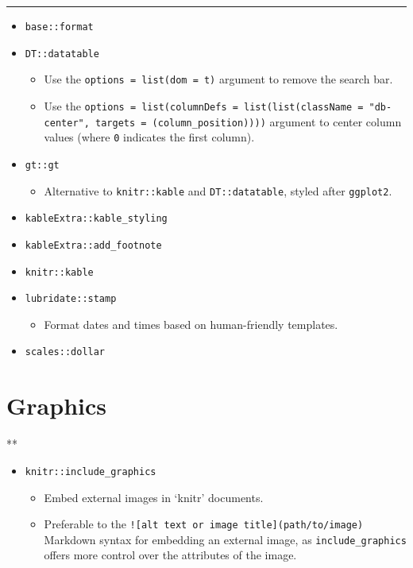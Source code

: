 \documentclass[
]{book}
\providecommand{\tightlist}{%
  \setlength{\itemsep}{0pt}\setlength{\parskip}{0pt}}
\begin{document}
\begin{center}\rule{0.5\linewidth}{0.5pt}\end{center}

\begin{itemize}
\tightlist
\item
  \texttt{base::format}
\item
  \texttt{DT::datatable}

  \begin{itemize}
  \tightlist
  \item
    Use the \texttt{options\ =\ list(dom\ =\ \textquotesingle{}t\textquotesingle{})} argument to remove the search bar.
  \item
    Use the \texttt{options\ =\ list(columnDefs\ =\ list(list(className\ =\ "db-center",\ targets\ =\ (column\_position))))} argument to center column values (where \texttt{0} indicates the first column).
  \end{itemize}
\item
  \texttt{gt::gt}

  \begin{itemize}
  \tightlist
  \item
    Alternative to \texttt{knitr::kable} and \texttt{DT::datatable}, styled after \texttt{ggplot2}.
  \end{itemize}
\item
  \texttt{kableExtra::kable\_styling}
\item
  \texttt{kableExtra::add\_footnote}
\item
  \texttt{knitr::kable}
\item
  \texttt{lubridate::stamp}

  \begin{itemize}
  \tightlist
  \item
    Format dates and times based on human-friendly templates.
  \end{itemize}
\item
  \texttt{scales::dollar}
\end{itemize}

\hypertarget{graphics}{%
\section{Graphics}\label{graphics}}

**

\begin{itemize}
\tightlist
\item
  \texttt{knitr::include\_graphics}

  \begin{itemize}
  \tightlist
  \item
    Embed external images in `knitr' documents.
  \item
    Preferable to the \texttt{!{[}alt\ text\ or\ image\ title{]}(path/to/image)} Markdown syntax for embedding an external image, as \texttt{include\_graphics} offers more control over the attributes of the image.
  \end{itemize}
\end{itemize}
\end{document}
